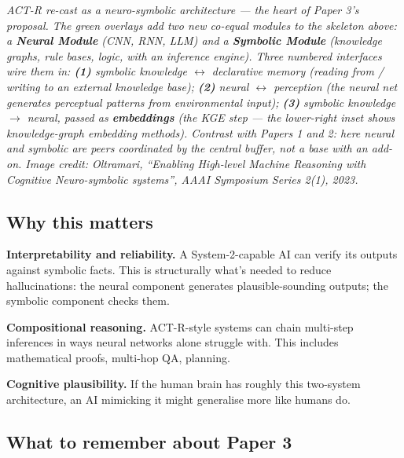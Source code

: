 \documentclass[11pt, a4paper]{article}
\begin{document}
\begin{center}

\footnotesize\textit{ACT-R re-cast as a neuro-symbolic architecture --- the heart of Paper 3's proposal. The green overlays add two new co-equal modules to the skeleton above: a \textbf{Neural Module} (CNN, RNN, LLM) and a \textbf{Symbolic Module} (knowledge graphs, rule bases, logic, with an inference engine). Three numbered interfaces wire them in: \textbf{(1)} symbolic knowledge $\leftrightarrow$ declarative memory (reading from / writing to an external knowledge base); \textbf{(2)} neural $\leftrightarrow$ perception (the neural net generates perceptual patterns from environmental input); \textbf{(3)} symbolic knowledge $\to$ neural, passed as \textbf{embeddings} (the KGE step --- the lower-right inset shows knowledge-graph embedding methods). Contrast with Papers 1 and 2: here neural and symbolic are peers coordinated by the central buffer, not a base with an add-on. Image credit: Oltramari, ``Enabling High-level Machine Reasoning with Cognitive Neuro-symbolic systems'', AAAI Symposium Series 2(1), 2023.}
\end{center}

\subsection{Why this matters}

\textbf{Interpretability and reliability.} A System-2-capable AI can verify its outputs against symbolic facts. This is structurally what's needed to reduce hallucinations: the neural component generates plausible-sounding outputs; the symbolic component checks them.

\textbf{Compositional reasoning.} ACT-R-style systems can chain multi-step inferences in ways neural networks alone struggle with. This includes mathematical proofs, multi-hop QA, planning.

\textbf{Cognitive plausibility.} If the human brain has roughly this two-system architecture, an AI mimicking it might generalise more like humans do.

\subsection{What to remember about Paper 3}
\end{document}
